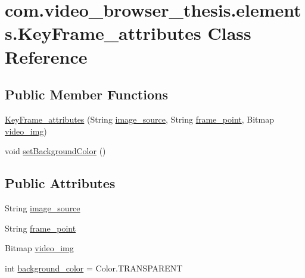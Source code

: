 \hypertarget{classcom_1_1video__browser__thesis_1_1elements_1_1_key_frame__attributes}{\section{com.\-video\-\_\-browser\-\_\-thesis.\-elements.\-Key\-Frame\-\_\-attributes Class Reference}
\label{classcom_1_1video__browser__thesis_1_1elements_1_1_key_frame__attributes}
}
\subsection*{Public Member Functions}
\begin{DoxyCompactItemize}
\item 
\hyperlink{classcom_1_1video__browser__thesis_1_1elements_1_1_key_frame__attributes_afcf26bea22581f51c2742963272d4850}{Key\-Frame\-\_\-attributes} (String \hyperlink{classcom_1_1video__browser__thesis_1_1elements_1_1_key_frame__attributes_a5ed2b10d8a5d915bec85bde3c7c8affb}{image\-\_\-source}, String \hyperlink{classcom_1_1video__browser__thesis_1_1elements_1_1_key_frame__attributes_aaf8f7f3cce30171b1b01b4a1baa9963a}{frame\-\_\-point}, Bitmap \hyperlink{classcom_1_1video__browser__thesis_1_1elements_1_1_key_frame__attributes_aed3349d4d97ecdd5d9a359cd03f6e74e}{video\-\_\-img})
\item 
void \hyperlink{classcom_1_1video__browser__thesis_1_1elements_1_1_key_frame__attributes_a9fae5b973c4fa95ee83e856965ebdf08}{set\-Background\-Color} ()
\end{DoxyCompactItemize}
\subsection*{Public Attributes}
\begin{DoxyCompactItemize}
\item 
String \hyperlink{classcom_1_1video__browser__thesis_1_1elements_1_1_key_frame__attributes_a5ed2b10d8a5d915bec85bde3c7c8affb}{image\-\_\-source}
\item 
String \hyperlink{classcom_1_1video__browser__thesis_1_1elements_1_1_key_frame__attributes_aaf8f7f3cce30171b1b01b4a1baa9963a}{frame\-\_\-point}
\item 
Bitmap \hyperlink{classcom_1_1video__browser__thesis_1_1elements_1_1_key_frame__attributes_aed3349d4d97ecdd5d9a359cd03f6e74e}{video\-\_\-img}
\item 
int \hyperlink{classcom_1_1video__browser__thesis_1_1elements_1_1_key_frame__attributes_a1b26a1bff2d460ae0b78d8ca9a56072a}{background\-\_\-color} = Color.\-T\-R\-A\-N\-S\-P\-A\-R\-E\-N\-T
\end{DoxyCompactItemize}


